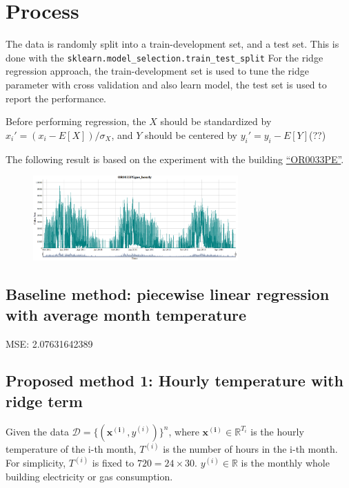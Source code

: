 \documentclass[12pt]{article}
\begin{document}
\section{Process}
The data is randomly split into a train-development set, and a test
set. This is done with the
\texttt{sklearn.model\_selection.train\_test\_split} For the ridge
regression approach, the train-development set is used to tune the
ridge parameter with cross validation and also learn model, the test
set is used to report the performance.

Before performing regression, the $X$ should be standardized by
$x_i' = (x_i - E[X])/\sigma_X$, and $Y$ should be centered by
$y_i' = y_i - E[Y]$(??)~\cite{ridgeRegTib2006}

The following result is based on the experiment with the building \href{http://128.2.109.159:8080/GSA/interval/trend/OR0033PE_gas.html}{``OR0033PE''}.
\begin{figure}[h]
  \centering
  \includegraphics[width=0.7\textwidth]{images/or0033peTrend.png}
\end{figure}
\subsection{Baseline method: piecewise linear regression with average month temperature}
MSE: 2.07631642389
\subsection{Proposed method 1: Hourly temperature with ridge term}
Given the data $\mathcal{D} = \{(\mathbf{x^{(i)}}, y^{(i)})\}^n$,
where $\mathbf{x^{(i)}} \in \mathbb{R}^{T_i}$ is the hourly
temperature of the i-th month, $T^{(i)}$ is the number of hours in the
i-th month. For simplicity, $T^{(i)}$ is fixed to
$720 = 24 \times 30$. $y^{(i)} \in \mathbb{R}$ is the monthly whole
building electricity or gas consumption.
\end{document}

